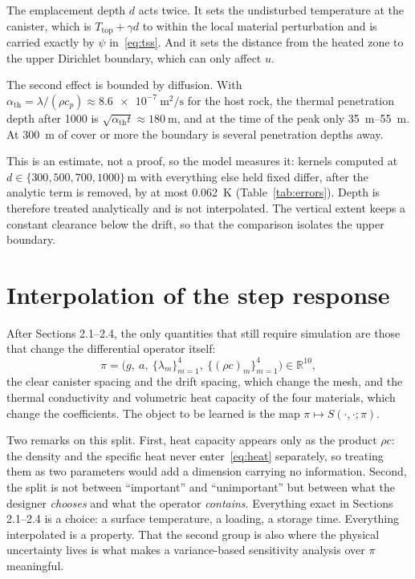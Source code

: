 \documentclass[11pt,a4paper]{article}
\theoremstyle{plain}
\newcommand{\Ttop}{T_{\mathrm{top}}}
\begin{document}
The emplacement depth $d$ acts twice. It sets the undisturbed temperature at
the canister, which is $\Ttop + \gamma d$ to within the local material
perturbation and is carried exactly by $\psi$ in~\eqref{eq:tss}. And it sets
the distance from the heated zone to the upper Dirichlet boundary, which can
only affect $u$.

The second effect is bounded by diffusion. With $\alpha_{\mathrm{th}} =
\lambda/(\rho c_p) \approx \SI{8.6e-7}{\metre\squared\per\second}$ for the host
rock, the thermal penetration depth after \SI{1000}{\annum} is
$\sqrt{\alpha_{\mathrm{th}} t} \approx \SI{180}{\metre}$, and at the time of the
peak only \SIrange{35}{55}{\metre}. At \SI{300}{\metre} of cover or more the
boundary is several penetration depths away.

This is an estimate, not a proof, so the model measures it: kernels computed at
$d \in \{300, 500, 700, 1000\}\,\si{\metre}$ with everything else held fixed
differ, after the analytic term is removed, by at most
\SI{0.062}{\kelvin} (Table~\ref{tab:errors}). Depth is therefore treated
analytically and is not interpolated. The vertical extent keeps a constant
clearance below the drift, so that the comparison isolates the upper boundary.

\section{Interpolation of the step response}

After Sections 2.1--2.4, the only quantities that still require simulation are
those that change the differential operator itself:
\[
  \pi = \bigl(g,\ a,\
    \{\lambda_m\}_{m=1}^{4},\ \{(\rho c)_m\}_{m=1}^{4}\bigr) \in \mathbb{R}^{10},
\]
the clear canister spacing and the drift spacing, which change the mesh, and
the thermal conductivity and volumetric heat capacity of the four materials,
which change the coefficients. The object to be learned is the map
$\pi \mapsto S(\cdot,\cdot;\pi)$.

Two remarks on this split. First, heat capacity appears only as the product
$\rho c$: the density and the specific heat never enter~\eqref{eq:heat}
separately, so treating them as two parameters would add a dimension carrying
no information. Second, the split is not between ``important'' and
``unimportant'' but between what the designer \emph{chooses} and what the
operator \emph{contains}. Everything exact in Sections 2.1--2.4 is a choice: a
surface temperature, a loading, a storage time. Everything interpolated is a
property. That the second group is also where the physical uncertainty lives is
what makes a variance-based sensitivity analysis over $\pi$ meaningful.
\end{document}
